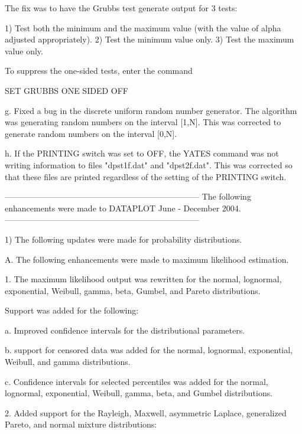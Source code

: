 {       The fix was to have the Grubbs test generate output for
       3 tests:

         1) Test both the minimum and the maximum value (with the
            value of alpha adjusted appropriately).
         2) Test the minimum value only.
         3) Test the maximum value only.

       To suppress the one-sided tests, enter the command

           SET GRUBBS ONE SIDED OFF

    g. Fixed a bug in the discrete uniform random number generator.
       The algorithm was generating random numbers on the interval
       [1,N].  This was corrected to generate random numbers on the
       interval [0,N].

    h. If the PRINTING switch was set to OFF, the YATES command
       was not writing information to files "dpst1f.dat" and
       "dpst2f.dat".  This was corrected so that these files are
       printed regardless of the setting of the PRINTING switch.

-----------------------------------------------------------------------
The following enhancements were made to DATAPLOT June - December  2004.
-----------------------------------------------------------------------

 1) The following updates were made for probability distributions.

    A. The following enhancements were made to maximum likelihood
       estimation.

       1. The maximum likelihood output was rewritten for the
          normal, lognormal, exponential, Weibull, gamma, beta,
          Gumbel, and Pareto distributions.

          Support was added for the following:

          a. Improved confidence intervals for the distributional
             parameters.

          b. support for censored data was added for the normal,
             lognormal, exponential, Weibull, and gamma distributions.

          c. Confidence intervals for selected percentiles was added
             for the normal, lognormal, exponential, Weibull, gamma,
             beta, and Gumbel distributions.

       2. Added support for the Rayleigh, Maxwell, asymmetric
          Laplace, generalized Pareto, and normal mixture
          distributions:

}
